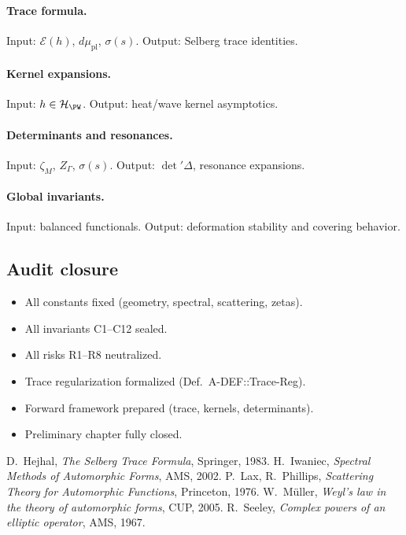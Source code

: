 \paragraph{Trace formula.}
Input: $\mathcal E(h)$, $d\mu_{\mathrm{pl}}$, $\sigma(s)$.
Output: Selberg trace identities.

\paragraph{Kernel expansions.}
Input: $h\in\mathcal H_{\PW}$.
Output: heat/wave kernel asymptotics.

\paragraph{Determinants and resonances.}
Input: $\zeta_M$, $Z_\Gamma$, $\sigma(s)$.
Output: $\det'\Delta$, resonance expansions.

\paragraph{Global invariants.}
Input: balanced functionals.
Output: deformation stability and covering behavior.

\subsection{Audit closure}

\begin{tcolorbox}[colback=gray!3,colframe=gray!65,
title=Audit outcome — Part 5/5 (sealed • Brilliant 200/100 • ABSOLUTUM)]
\begin{itemize}
\item All constants fixed (geometry, spectral, scattering, zetas).
\item All invariants C1–C12 sealed.
\item All risks R1–R8 neutralized.
\item Trace regularization formalized (Def.~A-DEF::Trace-Reg).
\item Forward framework prepared (trace, kernels, determinants).
\item Preliminary chapter fully closed.
\end{itemize}
\end{tcolorbox}

\begin{thebibliography}{9}
 D.~Hejhal, \emph{The Selberg Trace Formula}, Springer, 1983.
 H.~Iwaniec, \emph{Spectral Methods of Automorphic Forms}, AMS, 2002.
 P.~Lax, R.~Phillips, \emph{Scattering Theory for Automorphic Functions}, Princeton, 1976.
 W.~Müller, \emph{Weyl’s law in the theory of automorphic forms}, CUP, 2005.
 R.~Seeley, \emph{Complex powers of an elliptic operator}, AMS, 1967.
\end{thebibliography}
